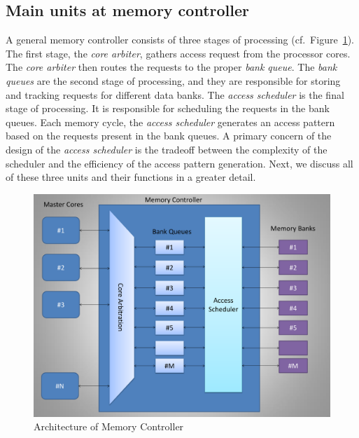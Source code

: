 \subsection{Main units at memory controller}
A general memory controller consists of three stages of processing (cf.~Figure~\ref{fig:pseudo-code}). The first stage, the {\em core arbiter}, gathers access request from the processor cores. The {\em core arbiter} then routes the requests to the proper {\em bank queue}. The {\em bank queues} are the second stage of processing, and they are responsible for storing and tracking requests for different data banks. The {\em access scheduler} is the final stage of processing. It is responsible for scheduling the requests in the bank queues. Each memory cycle, the {\em access scheduler} generates an access pattern based on the requests present in the bank queues. A primary concern of the design of the {\em access scheduler} is the tradeoff between the complexity of the scheduler and the efficiency of the access pattern generation. Next, we discuss all of these three units and their functions in a greater detail.
\begin{figure}[htbp]
\centering
	\includegraphics[width=0.7\linewidth]{fig/controllerArchitecture.pdf}
\caption{
{Architecture of Memory Controller} }
\label{fig:pseudo-code}
\end{figure}
